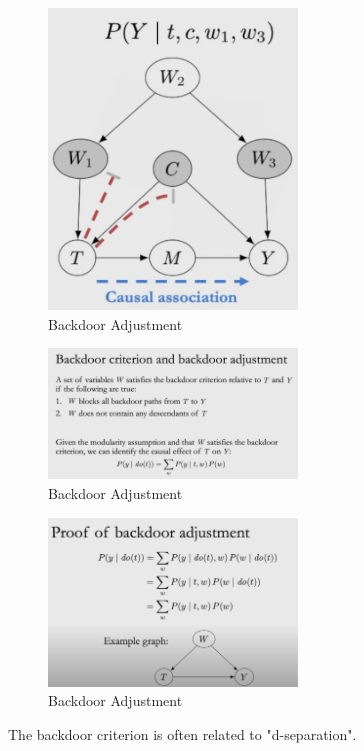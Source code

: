 \documentclass{article}
\begin{document}
\begin{figure}[H]
  \centering
  \includegraphics[width=250px]{draft-photos/backdoor_adjustment_explained_solution.png}
  \caption{Backdoor Adjustment}
  \label{fig:backdoor_adjustment_explained_solution}
\end{figure}

\begin{figure}[H]
  \centering
  \includegraphics[width=250px]{draft-photos/backdoor_adjustment_explanation.png}
  \caption{Backdoor Adjustment}
  \label{fig:backdoor_adjustment_explanation}
\end{figure}

\begin{figure}[H]
  \centering
  \includegraphics[width=250px]{draft-photos/backdoor_adjustment_explanation2.png}
  \caption{Backdoor Adjustment}
  \label{fig:backdoor_adjustment_explanation2}
\end{figure}

The backdoor criterion is often related to "d-separation".
\end{document}
